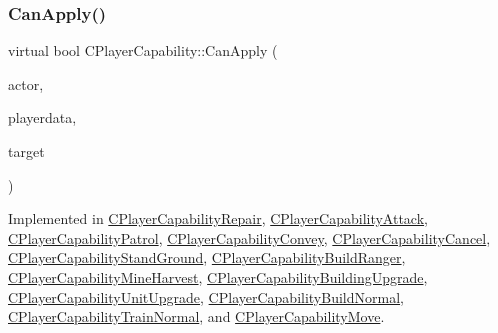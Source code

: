 \subsubsection{\texorpdfstring{Can\+Apply()}{CanApply()}}
{\footnotesize\ttfamily virtual bool C\+Player\+Capability\+::\+Can\+Apply (\begin{DoxyParamCaption}\item[{std\+::shared\+\_\+ptr$<$ \hyperlink{classCPlayerAsset}{C\+Player\+Asset} $>$}]{actor,  }\item[{std\+::shared\+\_\+ptr$<$ \hyperlink{classCPlayerData}{C\+Player\+Data} $>$}]{playerdata,  }\item[{std\+::shared\+\_\+ptr$<$ \hyperlink{classCPlayerAsset}{C\+Player\+Asset} $>$}]{target }\end{DoxyParamCaption})\hspace{0.3cm}{\ttfamily [pure virtual]}}



Implemented in \hyperlink{classCPlayerCapabilityRepair_ae989c67c5e14bbba5b2ddda993ee635a}{C\+Player\+Capability\+Repair}, \hyperlink{classCPlayerCapabilityAttack_ab5cdd55fa3838304fd551426e41f7b17}{C\+Player\+Capability\+Attack}, \hyperlink{classCPlayerCapabilityPatrol_a63c099d931e1e57db01120db7b1fdbe4}{C\+Player\+Capability\+Patrol}, \hyperlink{classCPlayerCapabilityConvey_a795b3eb4c3879a6d7da1cba7962a1c78}{C\+Player\+Capability\+Convey}, \hyperlink{classCPlayerCapabilityCancel_a0221e4e768c998cb46f1dbc757647ec1}{C\+Player\+Capability\+Cancel}, \hyperlink{classCPlayerCapabilityStandGround_a468f2618edaebf2088b5917d2688b6f6}{C\+Player\+Capability\+Stand\+Ground}, \hyperlink{classCPlayerCapabilityBuildRanger_a2e688d8f68ab53402afe9303dd28754a}{C\+Player\+Capability\+Build\+Ranger}, \hyperlink{classCPlayerCapabilityMineHarvest_a31da799cc9bc9be9f986bd878d13283a}{C\+Player\+Capability\+Mine\+Harvest}, \hyperlink{classCPlayerCapabilityBuildingUpgrade_a22de7902bcf6406a3b3a7c51e5c56f35}{C\+Player\+Capability\+Building\+Upgrade}, \hyperlink{classCPlayerCapabilityUnitUpgrade_a93d1a57f2cc52b90ce6cb714717bfefd}{C\+Player\+Capability\+Unit\+Upgrade}, \hyperlink{classCPlayerCapabilityBuildNormal_a1a8c6fdd9d8a91ecb7417163279e2276}{C\+Player\+Capability\+Build\+Normal}, \hyperlink{classCPlayerCapabilityTrainNormal_a625d2154bed47357f45662fe5dee7c1b}{C\+Player\+Capability\+Train\+Normal}, and \hyperlink{classCPlayerCapabilityMove_a76cbb0fa4051961c00e3169d11d76568}{C\+Player\+Capability\+Move}.

\hypertarget{classCPlayerCapability_aa83b1e1fcaff2985c378132d679154ea}{}\label{classCPlayerCapability_aa83b1e1fcaff2985c378132d679154ea} 

